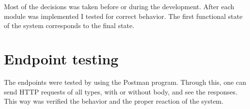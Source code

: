 Most of the decisions was taken before or during the development. After each module was implemented I tested for correct behavior. The first functional state of the system corresponds to the final state.

\section{Endpoint testing}

The endpoints were tested by using the Postman program. Through this, one can send HTTP requests of all types, with or without body, and see the responses. This way was verified the behavior and the proper reaction of the system.
